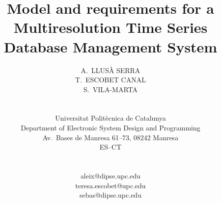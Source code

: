 \documentclass[twocolumn,11pt]{article}
\begin{document}
\global\def\refname{{\normalsize \it References:}}
%
\baselineskip 12.5pt
%
%
%
\title{\LARGE \bf Model and requirements for a Multiresolution Time Series
  Database Management System}

\date{}

\author{\hspace*{-10pt}
\begin{minipage}[t]{2.3in} \normalsize \baselineskip 12.5pt
\centerline{A.\ LLUSÀ SERRA}
\end{minipage} \kern 0in
\begin{minipage}[t]{2.3in} \normalsize \baselineskip 12.5pt
\centerline{T.\ ESCOBET CANAL}
\end{minipage} \kern 0in
\begin{minipage}[t]{2.3in} \normalsize \baselineskip 12.5pt
\centerline{S.\ VILA-MARTA}
\end{minipage} \\ \hspace*{-10pt}
%
\begin{minipage}[t]{2.7in} \normalsize \baselineskip 12.5pt
\centerline{Universitat Politècnica de Catalunya}
\centerline{Department of Electronic System Design and Programming}
\centerline{Av.\ Bases de Manresa 61--73, 08242 Manresa}
\centerline{ES--CT}
\end{minipage} \\ \hspace*{-10pt}
%
\begin{minipage}[t]{2.3in} \normalsize \baselineskip 12.5pt
\centerline{aleix@dipse.upc.edu}
\end{minipage} \kern 0in
\begin{minipage}[t]{2.3in} \normalsize \baselineskip 12.5pt
\centerline{teresa.escobet@upc.edu}
\end{minipage} \kern 0in
\begin{minipage}[t]{2.3in} \normalsize \baselineskip 12.5pt
\centerline{sebas@dipse.upc.edu}
\end{minipage} 
%
%
\\ \\ \hspace*{-10pt}
\begin{minipage}[b]{6.9in} \normalsize

\end{minipage}}
\end{document}
